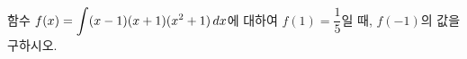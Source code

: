 함수 $f(x)=\displaystyle\int (x-1)(x+1)(x^2+1)\mkern3mu dx$에 대하여 $f(1)=\dfrac{1}{5}$일 때, $f(-1)$의 값을 구하시오.
